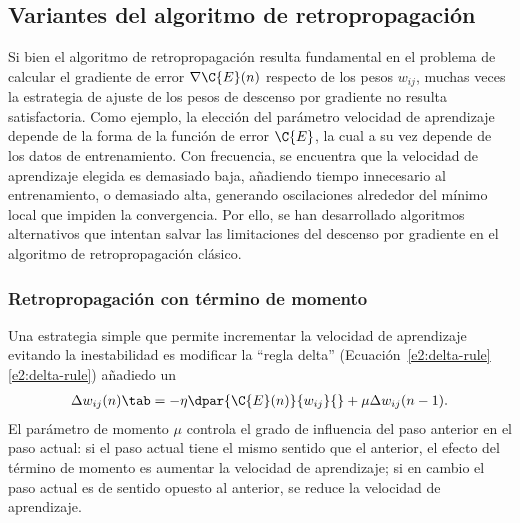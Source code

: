 %
\subsection{Variantes del algoritmo de retropropagación}
%
Si bien el algoritmo de retropropagación resulta fundamental en el
problema de calcular el gradiente de error $\nabla{\C{E}(n)}$ respecto
de los pesos $w_{ij}$, muchas veces la estrategia de ajuste de los
pesos de descenso por gradiente no resulta satisfactoria.  Como
ejemplo, la elección del parámetro velocidad de aprendizaje depende de
la forma de la función de error $\C{E}$, la cual a su vez depende de
los datos de entrenamiento.  Con frecuencia, se encuentra que la
velocidad de aprendizaje elegida es demasiado baja, añadiendo tiempo
innecesario al entrenamiento, o demasiado alta, generando oscilaciones
alrededor del mínimo local que impiden la convergencia.  Por ello, se
han desarrollado algoritmos alternativos que intentan salvar las
limitaciones del descenso por gradiente en el algoritmo de
retropropagación clásico.
%
\subsubsection{Retropropagación con término de momento}
%
Una estrategia simple que permite incrementar la velocidad de aprendizaje
evitando la inestabilidad es modificar la ``regla delta''
(\iflatexml{}Ecuación~\ref{e2:delta-rule}\else\autoref{e2:delta-rule}\fi)
añadiedo un 
%
\begin{align}\label{e2:momentum-term}
  \Delta w_{ij}(n)\tab=-\eta\dpar{\C{E}(n)}{w_{ij}}{}
  +\mu\Delta w_{ij}(n-1).
\end{align}
%
El parámetro de momento $\mu$ controla el grado de influencia del paso
anterior en el paso actual: si el paso actual tiene el mismo sentido
que el anterior, el efecto del término de momento es aumentar la
velocidad de aprendizaje; si en cambio el paso actual es de sentido
opuesto al anterior, se reduce la velocidad de aprendizaje.

%
